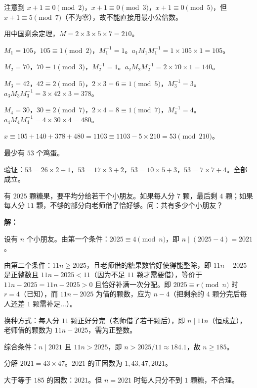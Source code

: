 \documentclass[12pt, a4paper]{ctexart}
\begin{document}
注意到 $x+1 \equiv 0 \pmod{2}$，$x+1 \equiv 0 \pmod{3}$，$x+1 \equiv 0 \pmod{5}$，但 $x+1 \equiv 5 \pmod{7}$（不为零），故不能直接用最小公倍数。

用中国剩余定理，$M = 2 \times 3 \times 5 \times 7 = 210$。

$M_1 = 105$，$105 \equiv 1 \pmod{2}$，$M_1^{-1} = 1$。$a_1 M_1 M_1^{-1} = 1 \times 105 \times 1 = 105$。

$M_2 = 70$，$70 \equiv 1 \pmod{3}$，$M_2^{-1} = 1$。$a_2 M_2 M_2^{-1} = 2 \times 70 \times 1 = 140$。

$M_3 = 42$，$42 \equiv 2 \pmod{5}$，$2 \times 3 = 6 \equiv 1 \pmod{5}$，$M_3^{-1} = 3$。$a_3 M_3 M_3^{-1} = 3 \times 42 \times 3 = 378$。

$M_4 = 30$，$30 \equiv 2 \pmod{7}$，$2 \times 4 = 8 \equiv 1 \pmod{7}$，$M_4^{-1} = 4$。$a_4 M_4 M_4^{-1} = 4 \times 30 \times 4 = 480$。

$x \equiv 105 + 140 + 378 + 480 = 1103 \equiv 1103 - 5 \times 210 = 53 \pmod{210}$。

最少有 $\boxed{53}$ 个鸡蛋。

验证：$53 = 26 \times 2 + 1$，$53 = 17 \times 3 + 2$，$53 = 10 \times 5 + 3$，$53 = 7 \times 7 + 4$。全部成立。

\begin{appbox}[【应用4】整除与分配问题]
有 $2025$ 颗糖果，要平均分给若干个小朋友。如果每人分 $7$ 颗，最后剩 $4$ 颗；如果每人分 $11$ 颗，不够的部分向老师借了恰好够。问：共有多少个小朋友？
\end{appbox}

\textbf{解：}

设有 $n$ 个小朋友。由第一个条件：$2025 \equiv 4 \pmod{n}$，即 $n \mid (2025 - 4) = 2021$。

由第二个条件：$11n \geqslant 2025$，且老师借的糖果数恰好使得能整除，即 $11n - 2025$ 是正整数且 $11n - 2025 < 11$（因为不足 $11$ 颗才需要借），等价于 $11n - 2025 = 11n - 2025 > 0$ 且恰好补满一次分配。即 $2025 \equiv r \pmod{n}$ 时 $r = 4$（已知），而 $11n - 2025$ 为借的颗数，应为 $n - 4$（把剩余的 $4$ 颗分完后每人还差 $1$ 颗需补足...）。

换种方式：每人分 $11$ 颗正好分完（老师借了若干颗后），即 $n \mid 11n$（恒成立），老师借的颗数为 $11n - 2025$，需为正整数。

综合条件：$n \mid 2021$ 且 $11n > 2025$，即 $n > 2025/11 \approx 184.1$，故 $n \geqslant 185$。

分解 $2021 = 43 \times 47$。$2021$ 的正因数为 $1, 43, 47, 2021$。

大于等于 $185$ 的因数：$2021$。但 $n = 2021$ 时每人只分不到 $1$ 颗糖，不合理。
\end{document}
